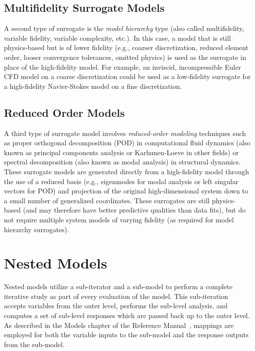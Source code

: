 \subsection{Multifidelity Surrogate Models} \label{models:surrogate:multifid}

A second type of surrogate is the {\em model hierarchy} type (also
called multifidelity, variable fidelity, variable complexity, etc.).
In this case, a model that is still physics-based but is of lower
fidelity (e.g., coarser discretization, reduced element order, looser
convergence tolerances, omitted physics) is used as the surrogate in
place of the high-fidelity model.  For example, an inviscid,
incompressible Euler CFD model on a coarse discretization could be
used as a low-fidelity surrogate for a high-fidelity Navier-Stokes
model on a fine discretization.

\subsection{Reduced Order Models} \label{models:surrogate:rom}

A third type of surrogate model involves {\em reduced-order modeling}
techniques such as proper orthogonal decomposition (POD) in
computational fluid dynamics (also known as principal components
analysis or Karhunen-Loeve in other fields) or spectral decomposition
(also known as modal analysis) in structural dynamics.  These
surrogate models are generated directly from a high-fidelity model
through the use of a reduced basis (e.g., eigenmodes for modal
analysis or left singular vectors for POD) and projection of the
original high-dimensional system down to a small number of generalized
coordinates.  These surrogates are still physics-based (and may
therefore have better predictive qualities than data fits), but do not
require multiple system models of varying fidelity (as required for
model hierarchy surrogates).

\section{Nested Models} \label{models:nested}

Nested models utilize a sub-iterator and a sub-model to perform a
complete iterative study as part of every evaluation of the model.
This sub-iteration accepts variables from the outer level, performs
the sub-level analysis, and computes a set of sub-level responses
which are passed back up to the outer level.  As described in the
Models chapter of the Reference Manual~\cite{RefMan}, mappings are
employed for both the variable inputs to the sub-model and the
response outputs from the sub-model.

